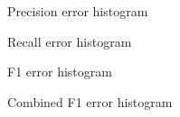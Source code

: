 \documentclass{article}
\begin{document}
\begin{figure}
    \centering
        
        \caption{Precision error histogram}
        \label{fig:precision_error_hist}
\end{figure}
\begin{figure}
    \centering
    
    \caption{Recall error histogram}
    \label{fig:recall_error_hist}
\end{figure}
\begin{figure}
    \centering
    
    \caption{F1 error histogram}
    \label{fig:f1_error_hist}
\end{figure}
\begin{figure}
    \centering
    
    \caption{Combined F1 error histogram}
    \label{fig:combined_f1_error_hist}
\end{figure}
\end{document}

